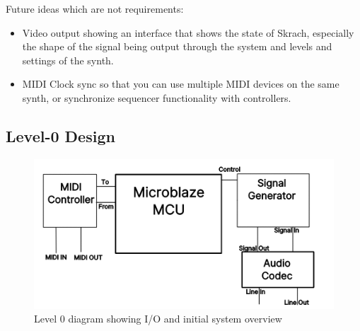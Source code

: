 \documentclass[12pt]{article}
\begin{document}
\noindent Future ideas which are not requirements:

\begin{itemize}
    \item Video output showing an interface that shows the state of Skrach, especially the shape of the signal being output through the system and levels and settings of the synth.
    \item MIDI Clock sync so that you can use multiple MIDI devices on the same synth, or synchronize sequencer functionality with controllers.
\end{itemize}

\subsection{Level-0 Design}

\begin{figure}[htb]
    \centering
    \includegraphics{img/level_0_diagram.png}
    \caption{Level 0 diagram showing I/O and initial system overview}
    \label{fig:level_0_figure}
\end{figure}
\end{document}
